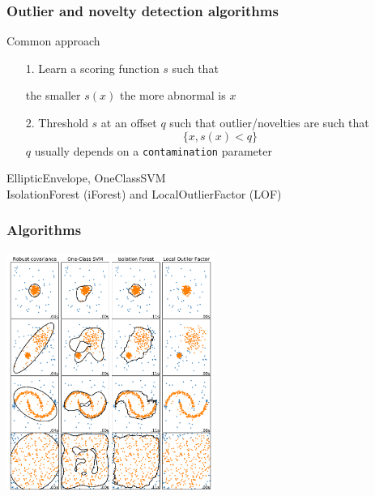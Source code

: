 \documentclass[slidetop,11pt]{beamer}
\begin{document}
\begin{frame}
\frametitle{Outlier and novelty detection algorithms}

Common approach

\vspace{0.5cm}

\begin{enumerate}
\item[1.] Learn a scoring function $s$ such that
\begin{center}
the smaller $s(x)$ the more abnormal is $x$
\end{center}

\vspace{0.5cm}

\item[2.] Threshold $s$ at an offset $q$ such that outlier/novelties are such that
\begin{equation*}
\{x, s(x) < q \}
\end{equation*}
$q$ usually depends on a \texttt{contamination} parameter
\end{enumerate}

\begin{center}
EllipticEnvelope, OneClassSVM \\
IsolationForest (iForest) and LocalOutlierFactor (LOF)
\end{center}

\end{frame}


\begin{frame}\frametitle{Algorithms}
    
\begin{center}
\includegraphics[width=6.8cm]{img/anomaly_comparison.pdf}
\end{center}

\end{frame}
\end{document}
